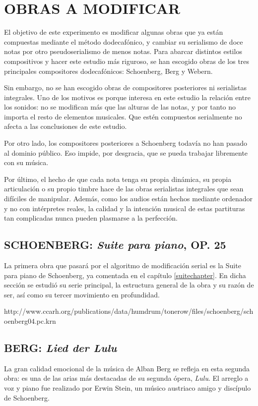     \section{OBRAS A MODIFICAR}
        El objetivo de este experimento es modificar algunas obras que ya están compuestas mediante el método dodecafónico, y cambiar su serialismo de doce notas por otro pseudoserialismo de menos notas. Para abarcar distintos estilos compositivos y hacer este estudio más riguroso, se han escogido obras de los tres principales compositores dodecafónicos: Schoenberg, Berg y Webern.
        
        Sin embargo, no se han escogido obras de compositores posteriores ni serialistas integrales. Uno de los motivos es porque interesa en este estudio la relación entre los sonidos: no se modifican más que las alturas de las notas, y por tanto no importa el resto de elementos musicales. Que estén compuestos serialmente no afecta a las conclusiones de este estudio.
        
        Por otro lado, los compositores posteriores a Schoenberg todavía no han pasado al dominio público. Eso impide, por desgracia, que se pueda trabajar libremente con su música.
        
        Por último, el hecho de que cada nota tenga su propia dinámica, su propia articulación o su propio timbre hace de las obras serialistas integrales que sean difíciles de manipular. Además, como los audios están hechos mediante ordenador y no con intérpretes reales, la calidad y la intención musical de estas partituras tan complicadas nunca pueden plasmarse a la perfección.
        
        \subsection{SCHOENBERG: \textit{Suite para piano}, OP. 25}
        La primera obra que pasará por el algoritmo de modificación serial es la Suite para piano de Schoenberg, ya comentada en el capítulo \ref{suitechapter}. En dicha sección se estudió su serie principal, la estructura general de la obra y su razón de ser, así como su tercer movimiento en profundidad.
        
        http://www.ccarh.org/publications/data/humdrum/tonerow/files/schoenberg/schoenberg04.pc.krn
        
        \subsection{BERG: \textit{Lied der Lulu}}
        La gran calidad emocional de la música de Alban Berg se refleja en esta segunda obra: es una de las arias más destacadas de su segunda ópera, \textit{Lulu}. El arreglo a voz y piano fue realizado por Erwin Stein, un músico austriaco amigo y discípulo de Schoenberg.
        
